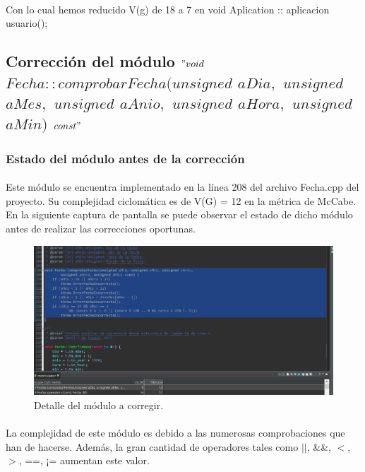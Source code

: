 		\paragraph{}Con lo cual hemos reducido V(g) de 18 a 7 en void Aplication :: aplicacion usuario();
	
	\subsection{Corrección del módulo $"void$ $Fecha::comprobarFecha(unsigned$ $aDia,$ $unsigned$ $aMes,$ $unsigned$ $aAnio,$ $unsigned$ $aHora,$ $unsigned$ $aMin)$ $const"$}
	
	\subsubsection{Estado del módulo antes de la corrección}
	
	\paragraph{}Este módulo se encuentra implementado en la línea 208 del archivo Fecha.cpp del proyecto. Su complejidad ciclomática es de V(G) = 12 en la métrica de McCabe. En la siguiente captura de pantalla se puede observar el estado de dicho módulo antes de realizar las correcciones oportunas.
	
	\begin{figure}[H]
		\centering
		\includegraphics[scale=0.9]{img/estebanFinal11.png}
		\caption{Detalle del módulo a corregir.}
		\label{estebanFinal11}
	\end{figure}
	
	\paragraph{}La complejidad de este módulo es debido a las numerosas comprobaciones que han de hacerse. Además, la gran cantidad de operadores tales como $|$$|$, \&\&, $<$, $>$, ==, ¡= aumentan este valor.
	
